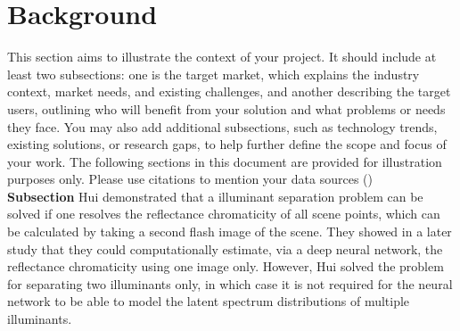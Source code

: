 \documentclass[final]{cvpr}
\begin{document}
\section{Background}
This section aims to illustrate the context of your project. It should include at least two subsections: one is the target market, which explains the industry context, market needs, and existing challenges, and another describing the target users, outlining who will benefit from your solution and what problems or needs they face. You may also add additional subsections, such as technology trends, existing solutions, or research gaps, to help further define the scope and focus of your work. The following sections in this document are provided for illustration purposes only. Please use citations to mention your data sources (\cite{zillow2020home,Curbio2023What,Barbara2022Will})
\\

\textbf{Subsection}  Hui \etal\cite{hui2017illuminant} demonstrated that a illuminant separation problem can be solved if one resolves the reflectance chromaticity of all scene points, which can be calculated by taking a second flash image of the scene. They showed in a later study \cite{hui2019learning} that they could computationally estimate, via a deep neural network, the reflectance chromaticity using one image only. However, Hui solved the problem for separating two illuminants only, in which case it is not required for the neural network to be able to model the latent spectrum distributions of multiple illuminants.

{}
\end{document}
